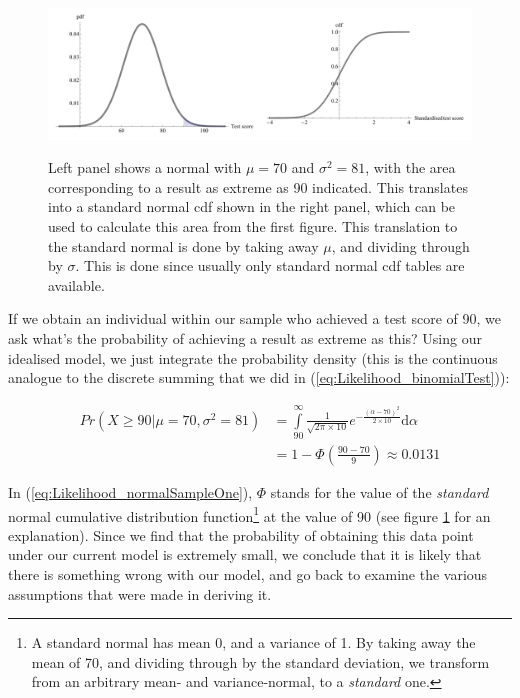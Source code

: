 \documentclass[11pt,fullpage]{book}
\begin{document}
\begin{figure}
\centering
\scalebox{0.35} 
{\includegraphics{likelihood_normal.pdf}}
\caption{Left panel shows a normal with $\mu=70$ and $\sigma^2 = 81$, with the area corresponding to a result as extreme as 90 indicated. This translates into a standard normal cdf shown in the right panel, which can be used to calculate this area from the first figure. This translation to the standard normal is done by taking away $\mu$, and dividing through by $\sigma$. This is done since usually only standard normal cdf tables are available.}\label{fig:Likelihood_normal}
\end{figure}

If we obtain an individual within our sample who achieved a test score of 90, we ask what's the probability of achieving a result as extreme as this? Using our idealised model, we just integrate the probability density (this is the continuous analogue to the discrete summing that we did in (\ref{eq:Likelihood_binomialTest})):

\begin{align}
Pr(X\geq 90|\mu=70,\sigma^2=81) &= \int\limits_{90}^{\infty}\frac{1}{\sqrt{2\pi\times 10}}e^{-\frac{(\alpha-70)^2}{2\times 10}} \mathrm{d}\alpha\\
 & = 1-\Phi\left(\frac{90-70}{9}\right) \approx 0.0131
\end{align}\label{eq:Likelihood_normalSampleOne}

In (\ref{eq:Likelihood_normalSampleOne}), $\Phi$ stands for the value of the \textit{standard} normal cumulative distribution function\footnote{A standard normal has mean 0, and a variance of 1. By taking away the mean of 70, and dividing through by the standard deviation, we transform from an arbitrary mean- and variance-normal, to a \textit{standard} one.} at the value of 90 (see figure \ref{fig:Likelihood_normal} for an explanation). Since we find that the probability of obtaining this data point under our current model is extremely small, we conclude that it is likely that there is something wrong with our model, and go back to examine the various assumptions that were made in deriving it.
\end{document}
